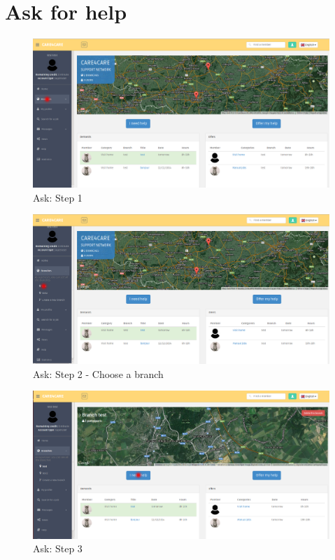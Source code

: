 \documentclass{article}
\begin{document}
\clearpage
\section{Ask for help}
\begin{figure}[!ht]
   \includegraphics[width=\textwidth]{img/dem1.png}
   \caption{Ask: Step 1}
\end{figure}
\begin{figure}[!ht]
   \includegraphics[width=\textwidth]{img/dem2.png}
   \caption{Ask: Step 2 - Choose a branch}
\end{figure}
\begin{figure}[!ht]
   \includegraphics[width=\textwidth]{img/dem3.png}
   \caption{Ask: Step 3}
\end{figure}
\end{document}
